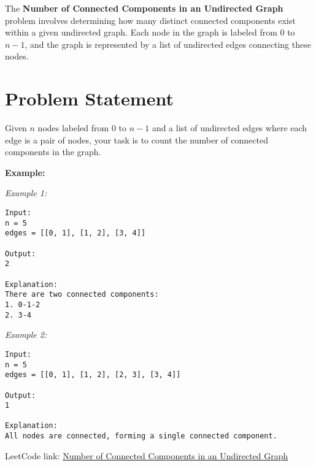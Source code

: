 
\label{problem:number_of_connected_components_in_an_undirected_graph}

The \textbf{Number of Connected Components in an Undirected Graph} problem involves determining how many distinct connected components exist within a given undirected graph. Each node in the graph is labeled from 0 to \(n - 1\), and the graph is represented by a list of undirected edges connecting these nodes.

\section*{Problem Statement}

Given \(n\) nodes labeled from 0 to \(n-1\) and a list of undirected edges where each edge is a pair of nodes, your task is to count the number of connected components in the graph.

\textbf{Example:}

\textit{Example 1:}

\begin{verbatim}
Input:
n = 5
edges = [[0, 1], [1, 2], [3, 4]]

Output:
2

Explanation:
There are two connected components:
1. 0-1-2
2. 3-4
\end{verbatim}

\textit{Example 2:}

\begin{verbatim}
Input:
n = 5
edges = [[0, 1], [1, 2], [2, 3], [3, 4]]

Output:
1

Explanation:
All nodes are connected, forming a single connected component.
\end{verbatim}

LeetCode link: \href{https://leetcode.com/problems/number-of-connected-components-in-an-undirected-graph/}{Number of Connected Components in an Undirected Graph}


